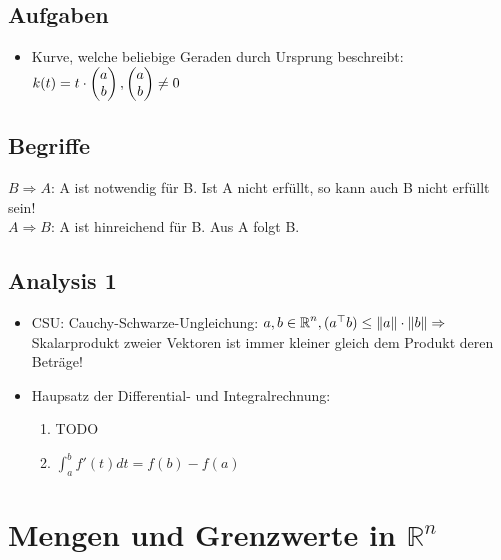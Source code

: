 \documentclass[german]{latex4ei/latex4ei_sheet}
\begin{document}
\begin{itemize}
\subsection{Aufgaben}
\begin{itemize}
\item Kurve, welche beliebige Geraden durch Ursprung beschreibt: $k(t)=t \cdot \begin{pmatrix} a \\b \end{pmatrix}, \begin{pmatrix} a\\b \end{pmatrix}\neq 0$
\end{itemize}

\end{itemize}
\subsection{Begriffe}
$B \Rightarrow A$: A ist notwendig f\"ur B. Ist A nicht erf\"ullt, so kann auch B nicht erf\"ullt sein!\\
$A \Rightarrow B$: A ist hinreichend f\"ur B. Aus A folgt B.


\subsection*{Analysis 1}
\begin{itemize}
\item CSU: Cauchy-Schwarze-Ungleichung: $a,b \in \operatorname{\mathbb R}^n, (a^\top b)\le \|a\|\cdot \|b\| \Rightarrow$ Skalarprodukt zweier Vektoren ist immer kleiner gleich dem Produkt deren Betr\"age! 
\item Haupsatz der Differential- und Integralrechnung:
\begin{enumerate}
\item TODO
\item $\int_a^b f'(t) d t=f(b)-f(a)$
\end{enumerate}
\end{itemize}

\section{Mengen und Grenzwerte in $\mathbb{R}^n$}
\end{document}
